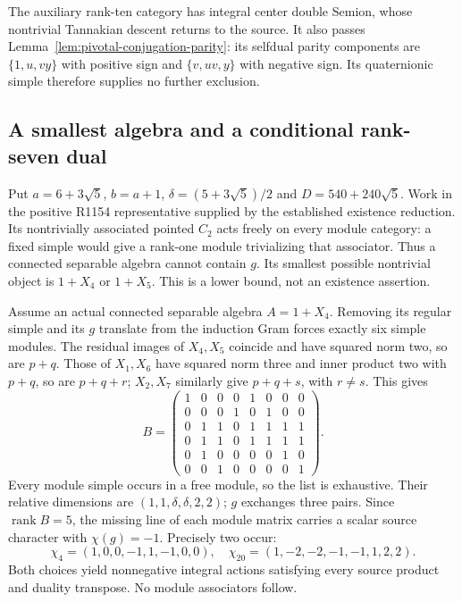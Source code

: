 The auxiliary rank-ten category has integral center double Semion,
whose nontrivial Tannakian descent returns to the source. It also passes
Lemma~\ref{lem:pivotal-conjugation-parity}: its selfdual parity components
are $\{1,u,vy\}$ with positive sign and $\{v,uv,y\}$ with negative
sign. Its quaternionic simple therefore supplies no further exclusion.


\subsection{A smallest algebra and a conditional rank-seven dual}
\label{sec:r1154-rank7-route}
Put $a=6+3\sqrt5$, $b=a+1$, $\delta=(5+3\sqrt5)/2$ and
$D=540+240\sqrt5$. Work in the positive R1154 representative
supplied by the established existence reduction.
Its nontrivially associated pointed $C_2$ acts freely on every module
category: a fixed simple would give a rank-one module trivializing that
associator. Thus a connected separable algebra cannot contain $g$.
Its smallest possible nontrivial object is $1+X_4$ or $1+X_5$.
This is a lower bound, not an existence assertion.

Assume an actual connected separable algebra $A=1+X_4$. Removing its
regular simple and its $g$ translate from the induction Gram forces
exactly six simple modules. The residual images of $X_4,X_5$ coincide
and have squared norm two, so are $p+q$. Those of $X_1,X_6$ have
squared norm three and inner product two with $p+q$, so are $p+q+r$;
$X_2,X_7$ similarly give $p+q+s$, with $r\ne s$. This gives
\[
B=\begin{pmatrix}
1&0&0&0&1&0&0&0\\
0&0&0&1&0&1&0&0\\
0&1&1&0&1&1&1&1\\
0&1&1&0&1&1&1&1\\
0&1&0&0&0&0&1&0\\
0&0&1&0&0&0&0&1
\end{pmatrix}.
\]
Every module simple occurs in a free module, so the list is exhaustive.
Their relative dimensions are $(1,1,\delta,\delta,2,2)$; $g$ exchanges
three pairs. Since $\operatorname{rank}B=5$, the missing line of each
module matrix carries a scalar source character with $\chi(g)=-1$.
Precisely two occur:
\[
\chi_4=(1,0,0,-1,1,-1,0,0),\quad
\chi_{20}=(1,-2,-2,-1,-1,1,2,2).
\]
Both choices yield nonnegative integral actions satisfying every
source product and duality transpose. No module associators follow.

